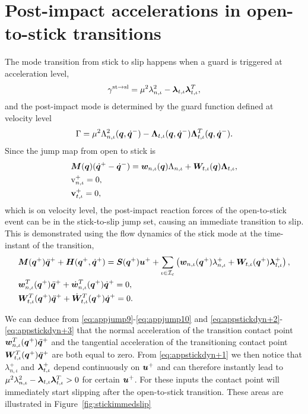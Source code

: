 \documentclass[../DC2017114Bouma.tex]{subfiles}
\begin{document}
\section{Post-impact accelerations in open-to-stick transitions}\label{app:instantslip}
The mode transition from stick to slip happens when a guard is triggered at acceleration level, 
\begin{align}
\gamma^{\text{st}\rightarrow\text{sl}} = \mu^2\lambda_{n,\iota}^2 - \boldsymbol{\lambda}_{t,\iota}\boldsymbol{\lambda}_{t,\iota}^T,
\end{align}
and the post-impact mode is determined by the guard function defined at velocity level
\begin{align}
\Gamma = \mu^2 \Lambda_{n,\iota}^2({\boldsymbol{q}},\dot{{\boldsymbol{q}}}^-) - \boldsymbol{\Lambda}_{t,\iota}({\boldsymbol{q}},\dot{{\boldsymbol{q}}}^-)\boldsymbol{\Lambda}_{t,\iota}^T({\boldsymbol{q}},\dot{{\boldsymbol{q}}}^-). \label{eq:appopentostick}
\end{align}
Since the jump map from open to stick is
\begin{align}
&{\boldsymbol{M}}({\boldsymbol{q}})(\dot{{\boldsymbol{q}}}^+ - \dot{{\boldsymbol{q}}}^-) = {\boldsymbol{w}}_{n,\iota}({\boldsymbol{q}})\Lambda_{n,\iota} + {\boldsymbol{W}}_{t,\iota}({\boldsymbol{q}})\boldsymbol{\Lambda}_{t,\iota},\label{eq:appjump8}\\
&\mathrm{v}_{n,\iota}^+ = 0,\label{eq:appjump9}\\
&\mathbf{v}_{t,\iota}^+ = 0,\label{eq:appjump10}
\end{align}
which is on velocity level, the post-impact reaction forces of the open-to-stick event can be in the stick-to-slip jump set, causing an immediate transition to slip. This is demonstrated using the flow dynamics of the stick mode at the time-instant of the transition,
\begin{align}
&{\boldsymbol{M}}({\boldsymbol{q}}^+)\ddot{{\boldsymbol{q}}}^+ + {\boldsymbol{H}}({\boldsymbol{q}}^+,\dot{{\boldsymbol{q}}}^+) = {\boldsymbol{S}}({\boldsymbol{q}}^+){\boldsymbol{u}}^+ + \sum_{\iota\in\mathcal{I}_c}\left({\boldsymbol{w}}_{n,\iota}({\boldsymbol{q}}^+)\lambda^+_{n,\iota} + {\boldsymbol{W}}_{t,\iota}({\boldsymbol{q}}^+)\boldsymbol{\lambda}^+_{t,\iota} \right), \label{eq:appstickdyn+1}\\
&{\boldsymbol{w}}^T_{n,\iota}({\boldsymbol{q}}^+)\ddot{{\boldsymbol{q}}}^+ + \dot{{\boldsymbol{w}}}^T_{n,\iota}({\boldsymbol{q}}^+)\dot{{\boldsymbol{q}}}^+ = 0,\label{eq:appstickdyn+2}\\
&{\boldsymbol{W}}^T_{t,\iota}({\boldsymbol{q}}^+)\ddot{{\boldsymbol{q}}}^+ + \dot{{\boldsymbol{W}}}^T_{t,\iota}({\boldsymbol{q}}^+)\dot{{\boldsymbol{q}}}^+ = 0.\label{eq:appstickdyn+3}
\end{align}

We can deduce from \eqref{eq:appjump9}-\eqref{eq:appjump10} and \eqref{eq:appstickdyn+2}-\eqref{eq:appstickdyn+3} that the normal acceleration of the transition contact point ${\boldsymbol{w}}^T_{n,\iota}({\boldsymbol{q}}^+)\ddot{{\boldsymbol{q}}}^+$ and the tangential acceleration of the transitioning contact point ${\boldsymbol{W}}^T_{t,\iota}({\boldsymbol{q}}^+)\ddot{{\boldsymbol{q}}}^+$ are both equal to zero. From \eqref{eq:appstickdyn+1} we then notice that $\lambda_{n,\iota}^+$ and $\boldsymbol{\lambda}_{t,\iota}^+$ depend continuously on ${\boldsymbol{u}}^+$ and can therefore instantly lead to $\mu^2\lambda_{n,\iota}^2 - \boldsymbol{\lambda}_{t,\iota}\boldsymbol{\lambda}_{t,\iota}^T>0$ for certain ${\boldsymbol{u}}^+$. For these inputs the contact point will immediately start slipping after the open-to-stick transition. These areas are illustrated in Figure~\ref{fig:stickimmedslip}
\end{document}
